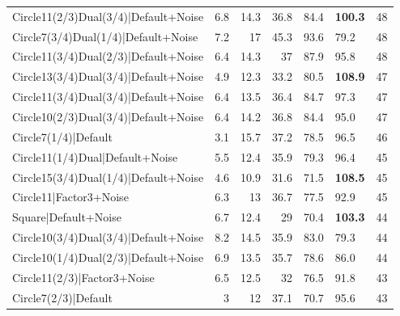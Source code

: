 \begin{tabular}{lrrrllr}
 Circle11(2/3)Dual(3/4)|Default+Noise &             6.8 &           14.3 &            36.8 & 84.4            & \textbf{100.3}  &           48 \\
 Circle7(3/4)Dual(1/4)|Default+Noise  &             7.2 &           17   &            45.3 & 93.6            & 79.2            &           48 \\
 Circle11(3/4)Dual(2/3)|Default+Noise &             6.4 &           14.3 &            37   & 87.9            & 95.8            &           48 \\
 Circle13(3/4)Dual(3/4)|Default+Noise &             4.9 &           12.3 &            33.2 & 80.5            & \textbf{108.9}  &           47 \\
 Circle11(3/4)Dual(3/4)|Default+Noise &             6.4 &           13.5 &            36.4 & 84.7            & 97.3            &           47 \\
 Circle10(2/3)Dual(3/4)|Default+Noise &             6.4 &           14.2 &            36.8 & 84.4            & 95.0            &           47 \\
 Circle7(1/4)|Default                 &             3.1 &           15.7 &            37.2 & 78.5            & 96.5            &           46 \\
 Circle11(1/4)Dual|Default+Noise      &             5.5 &           12.4 &            35.9 & 79.3            & 96.4            &           45 \\
 Circle15(3/4)Dual(1/4)|Default+Noise &             4.6 &           10.9 &            31.6 & 71.5            & \textbf{108.5}  &           45 \\
 Circle11|Factor3+Noise               &             6.3 &           13   &            36.7 & 77.5            & 92.9            &           45 \\
 Square|Default+Noise                 &             6.7 &           12.4 &            29   & 70.4            & \textbf{103.3}  &           44 \\
 Circle10(3/4)Dual(3/4)|Default+Noise &             8.2 &           14.5 &            35.9 & 83.0            & 79.3            &           44 \\
 Circle10(1/4)Dual(2/3)|Default+Noise &             6.9 &           13.5 &            35.7 & 78.6            & 86.0            &           44 \\
 Circle11(2/3)|Factor3+Noise          &             6.5 &           12.5 &            32   & 76.5            & 91.8            &           43 \\
 Circle7(2/3)|Default                 &             3   &           12   &            37.1 & 70.7            & 95.6            &           43 \\

\end{tabular}
